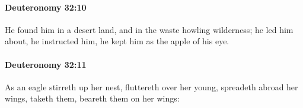 		\paragraph{Deuteronomy 32:10} %
			\label{DEUTERONOMY-32-10}

			He found him in a desert land, and in the waste howling wilderness; he led him about, he instructed him, he kept him as the apple of his eye.


		\paragraph{Deuteronomy 32:11} %
			\label{DEUTERONOMY-32-11}

			As an eagle stirreth up her nest, fluttereth over her young, spreadeth abroad her wings, taketh them, beareth them on her wings:


